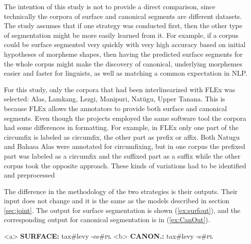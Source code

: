 
The intention of this study is not to provide a direct comparison, since technically the corpora of surface and canonical segments are different datasets. The study assumes that if one strategy was conducted first, then the other type of segmentation might be more easily learned from it. For example, if a corpus could be surface segmented very quickly with very high accuracy based on initial hypotheses of morpheme shapes, then having the predicted surface segments for the whole corpus might make the discovery of canonical, underlying morphemes easier and faster for linguists, as well as matching a common expectation in NLP. 

For this study, only the corpora that had been interlinearized with FLEx was selected:  Alas, Lamkang, Lezgi, Manipuri, Nat\"ugu, Upper Tanana. This is because FLEx allows the annotators to provide both surface and canonical segments.
Even though the projects employed the same software tool the corpora had some differences in formatting. For example, in FLEx only one part of the circumfix is labeled as circumfix, the other part as prefix or affix. Both Natugu and Bahasa Alas were annotated for circumfixing, but in one corpus the prefixed part was labeled as a circumfix and the suffixed part as a suffix while the other corpus took the opposite approach. These kinds of variations had to be identified and preprocessed

The difference in the methodology of the two strategies is their outputs. Their input does not change and it is the same as the models described in section \ref{sec:joint}. The output for surface segmentation is shown (\ref{ex:surfout}), and the corresponding output for canonical segmentation is in (\ref{ex:CanOut}).

\pex   
\label{ex:CanInOut}
\a<a> \textbf{SURFACE:} \hspace{2 mm} tax\#levy \hspace{3 mm} -es\#\textsc{pl}
\label{ex:surfout}
\a<b> \textbf{CANON.:} \hspace{4 mm} tax\#levy \hspace{3 mm} -s\#\textsc{pl} 
\label{ex:CanOut}
\xe

